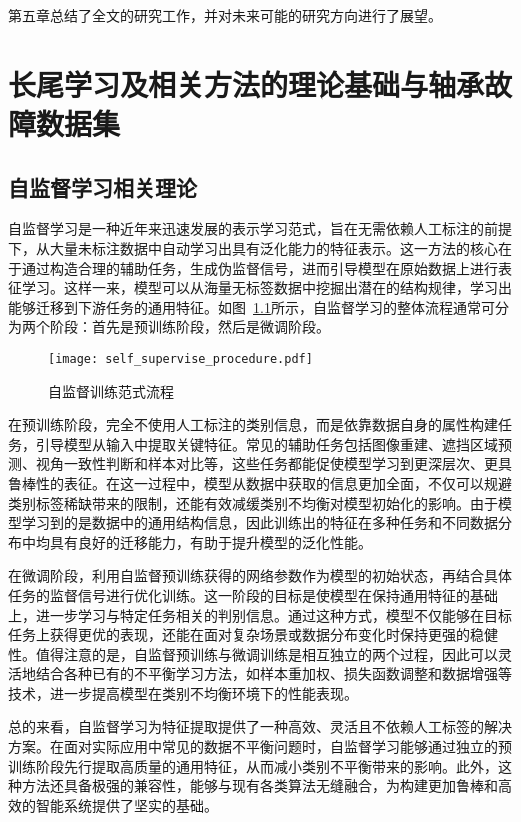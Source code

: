\documentclass[master]{thesis-uestc}
\begin{document}
第五章总结了全文的研究工作，并对未来可能的研究方向进行了展望。


\chapter{长尾学习及相关方法的理论基础与轴承故障数据集}
\section{自监督学习相关理论}
自监督学习是一种近年来迅速发展的表示学习范式，旨在无需依赖人工标注的前提下，从大量未标注数据中自动学习出具有泛化能力的特征表示。这一方法的核心在于通过构造合理的辅助任务，生成伪监督信号，进而引导模型在原始数据上进行表征学习。这样一来，模型可以从海量无标签数据中挖掘出潜在的结构规律，学习出能够迁移到下游任务的通用特征。如图~\ref{self_supervise_procedure}所示，自监督学习的整体流程通常可分为两个阶段：首先是预训练阶段，然后是微调阶段。

\begin{figure}[h]
    \texttt{[image: self\_supervise\_procedure.pdf]}
    \caption{自监督训练范式流程}
    \label{self_supervise_procedure}
\end{figure}

在预训练阶段，完全不使用人工标注的类别信息，而是依靠数据自身的属性构建任务，引导模型从输入中提取关键特征。常见的辅助任务包括图像重建、遮挡区域预测、视角一致性判断和样本对比等，这些任务都能促使模型学习到更深层次、更具鲁棒性的表征。在这一过程中，模型从数据中获取的信息更加全面，不仅可以规避类别标签稀缺带来的限制，还能有效减缓类别不均衡对模型初始化的影响。由于模型学习到的是数据中的通用结构信息，因此训练出的特征在多种任务和不同数据分布中均具有良好的迁移能力，有助于提升模型的泛化性能。

在微调阶段，利用自监督预训练获得的网络参数作为模型的初始状态，再结合具体任务的监督信号进行优化训练。这一阶段的目标是使模型在保持通用特征的基础上，进一步学习与特定任务相关的判别信息。通过这种方式，模型不仅能够在目标任务上获得更优的表现，还能在面对复杂场景或数据分布变化时保持更强的稳健性。值得注意的是，自监督预训练与微调训练是相互独立的两个过程，因此可以灵活地结合各种已有的不平衡学习方法，如样本重加权、损失函数调整和数据增强等技术，进一步提高模型在类别不均衡环境下的性能表现。

总的来看，自监督学习为特征提取提供了一种高效、灵活且不依赖人工标签的解决方案。在面对实际应用中常见的数据不平衡问题时，自监督学习能够通过独立的预训练阶段先行提取高质量的通用特征，从而减小类别不平衡带来的影响。此外，这种方法还具备极强的兼容性，能够与现有各类算法无缝融合，为构建更加鲁棒和高效的智能系统提供了坚实的基础。
\end{document}
